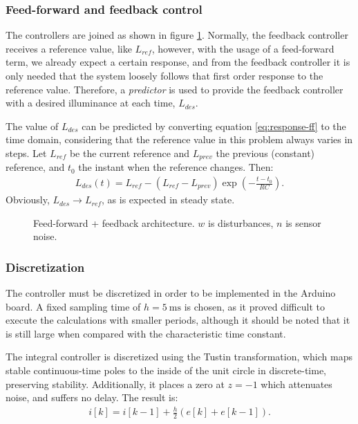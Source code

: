 \documentclass[english,fira]{ist-report}
\begin{document}

\subsubsection{Feed-forward and feedback control}

The controllers are joined as shown in figure \ref{fig:ff+fb}. 
Normally, the feedback controller receives a reference value, like $L_{ref}$, however, with the usage of a feed-forward term, we already expect a certain response, and from the feedback controller it is only needed that the system loosely follows that first order response to the reference value.
Therefore, a \emph{predictor} is used to provide the feedback controller with a desired illuminance at each time, $L_{des}$. 

The value of $L_{des}$ can be predicted by converting equation \ref{eq:response-ff} to the time domain, considering that the reference value in this problem always varies in steps. 
Let $L_{ref}$ be the current reference and $L_{prev}$ the previous (constant) reference, and $t_0$ the instant when the reference changes. Then:
\begin{align}
    L_{des}(t) = L_{ref} - \left( L_{ref}-L_{prev} \right)\exp\left(-\frac{t-t_0}{RC}\right).
    \label{eq:predictor}
\end{align}
Obviously, $L_{des} \rightarrow L_{ref}$, as is expected in steady state.

\begin{figure}[ht]
    \centering
    \resizebox{\linewidth}{!}{}
    \caption{Feed-forward + feedback architecture. $w$ is disturbances, $n$ is sensor noise.}
    \label{fig:ff+fb}
\end{figure}

\subsubsection{Discretization}

The controller must be discretized in order to be implemented in the Arduino board. A fixed sampling time of $h=\SI{5}{\milli\second}$ is chosen, as it proved difficult to execute the calculations with smaller periods, although it should be noted that it is still large when compared with the characteristic time constant.

The integral controller is discretized using the Tustin transformation, which maps stable continuous-time poles to the inside of the unit circle in discrete-time, preserving stability. Additionally, it places a zero at $z=-1$ which attenuates noise, and suffers no delay. 
The result is:
\begin{align}
    i[k] = i[k-1] + \frac{h}{2}\left( e[k] + e[k-1] \right).
    \label{eq:integral-tustin}
\end{align}
\end{document}
